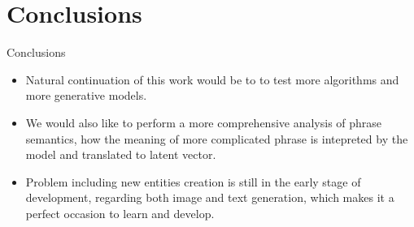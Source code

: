 \documentclass[t]{beamer}
\begin{document}
\section{Conclusions}

\begin{frame}[c]{Conclusions}
\begin{itemize}
\item Natural continuation of this work would be to to test more algorithms and more generative models. 
\item We would also like to perform a more comprehensive analysis of phrase semantics, how the meaning of more complicated phrase is intepreted by the model and translated to latent vector.
\item Problem including new entities creation is still in the early stage of development, regarding both image and text generation, which makes it a perfect occasion to learn and develop.
\end{itemize}
\end{frame}
\end{document}
